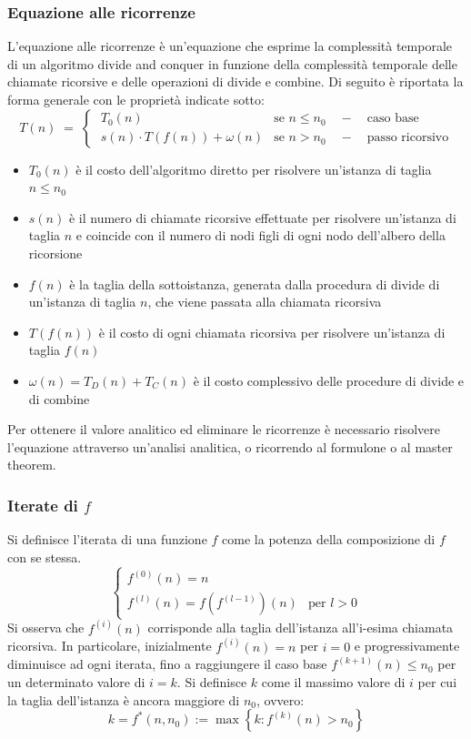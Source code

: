 \subsubsection*{Equazione alle ricorrenze}
L'equazione alle ricorrenze è un'equazione che esprime la complessità temporale di un algoritmo divide and conquer
in funzione della complessità temporale delle chiamate ricorsive e delle operazioni di divide e combine. Di seguito
è riportata la forma generale con le proprietà indicate sotto:
\[T(n) \; = \; \begin{cases}
	\; T_0(n) & \text{se } n \leq n_0 \quad - \quad \text{caso base} \\[3pt]
	\; s(n) \cdot T(f(n)) + \omega(n) & \text{se } n > n_0 \quad - \quad \text{passo ricorsivo}
\end{cases}\]
\begin{itemize}
	\item \(T_0(n)\) è il costo dell'algoritmo diretto per risolvere un'istanza di taglia \(n \leq n_0\)
	\item \(s(n)\) è il numero di chiamate ricorsive effettuate per risolvere un'istanza di taglia \(n\) e coincide con
	il numero di nodi figli di ogni nodo dell'albero della ricorsione
	\item \(f(n)\) è la taglia della sottoistanza, generata dalla procedura di divide di un'istanza di taglia \(n\), che
	viene passata alla chiamata ricorsiva
	\item \(T(f(n))\) è il costo di ogni chiamata ricorsiva per risolvere un'istanza di taglia \(f(n)\)
	\item \(\omega(n) = T_D(n) + T_C(n)\) è il costo complessivo delle procedure di divide e di combine
\end{itemize}

\vspace{5pt}

\noindent
Per ottenere il valore analitico ed eliminare le ricorrenze è necessario risolvere l'equazione attraverso un'analisi
analitica, o ricorrendo al formulone o al master theorem. 

\subsubsection*{Iterate di \(f\)}
Si definisce l'iterata di una funzione \(f\) come la potenza della composizione di \(f\) con se stessa.
\[\begin{cases}
	f^{(0)}(n) = n \\[3pt]
	f^{(l)}(n) = f(f^{(l-1)})(n) & \text{per } l > 0
\end{cases}\]
Si osserva che \(f^{(i)}(n)\) corrisponde alla taglia dell'istanza all'i-esima chiamata ricorsiva. In particolare,
inizialmente \(f^{(i)}(n) = n\) per \(i = 0\) e progressivamente diminuisce ad ogni iterata, fino a raggiungere il caso
base \(f^{(k+1)}(n) \leq n_0\) per un determinato valore di \(i = k\). Si definisce \(k\) come il massimo valore di \(i\)
per cui la taglia dell'istanza è ancora maggiore di \(n_0\), ovvero:
\[k = f^*(n, n_0) := \max \left\{ k : f^{(k)}(n) > n_0 \right\}\]

